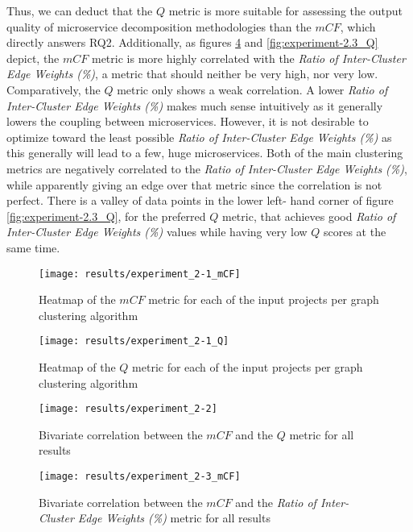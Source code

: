\documentclass[12pt,a4paper]{report}
\begin{document}
Thus, we can deduct that the $Q$ metric is more suitable for assessing the
output quality of microservice decomposition methodologies than the $mCF$,
which directly answers RQ2. Additionally, as figures \ref{fig:experiment-2.3_mCF}
and \ref{fig:experiment-2.3_Q} depict, the $mCF$ metric is more highly
correlated with the \textit{Ratio of Inter-Cluster Edge Weights (\%)}, a metric
that should neither be very high, nor very low. Comparatively, the $Q$ metric
only shows a weak correlation. A lower \textit{Ratio of Inter-Cluster Edge
Weights (\%)} makes much sense intuitively as it generally lowers the coupling
between microservices. However, it is not desirable to optimize toward the
least possible \textit{Ratio of Inter-Cluster Edge Weights (\%)} as this
generally will lead to a few, huge microservices. Both of the main clustering
metrics are negatively correlated to the \textit{Ratio of Inter-Cluster Edge
Weights (\%)}, while apparently giving an edge over that metric since the
correlation is not perfect. There is a valley of data points in the lower left\hyp
hand corner of figure \ref{fig:experiment-2.3_Q}, for the preferred $Q$ metric,
that achieves good \textit{Ratio of Inter-Cluster Edge Weights (\%)} values
while having very low $Q$ scores at the same time.

\begin{figure}[htbp]
\centering
\texttt{[image: results/experiment\_2-1\_mCF]}
\caption{Heatmap of the $mCF$ metric for each of the input projects per graph clustering algorithm}
\label{fig:experiment-2.1_mCF}
\end{figure}

\begin{figure}[htbp]
\centering
\texttt{[image: results/experiment\_2-1\_Q]}
\caption{Heatmap of the $Q$ metric for each of the input projects per graph clustering algorithm}
\label{fig:experiment-2.1_Q}
\end{figure}

\begin{figure}[htbp]
\centering
\texttt{[image: results/experiment\_2-2]}
\caption{Bivariate correlation between the $mCF$ and the $Q$ metric for all results}
\label{fig:experiment-2.2}
\end{figure}

\begin{figure}[htbp]
\centering
\texttt{[image: results/experiment\_2-3\_mCF]}
\caption{Bivariate correlation between the $mCF$ and the \textit{Ratio of Inter-Cluster Edge Weights (\%)} metric for all results}
\label{fig:experiment-2.3_mCF}
\end{figure}
\end{document}
